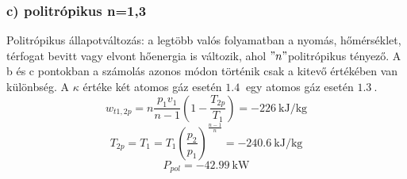 \subsubsection{c) politrópikus n=1,3}
Politrópikus állapotváltozás: a legtöbb valós folyamatban a nyomás, hőmérséklet, térfogat bevitt vagy elvont hőenergia is változik, ahol $"n"$politrópikus tényező. A b és c pontokban a számolás azonos módon történik csak a kitevő értékében van különbség.
A $\kappa$ értéke két atomos gáz esetén $\SI{1,4}{}$ egy atomos gáz esetén $\SI{1,3}{}$.
\begin{equation}
w_{t1,2p}=n\frac{p_1v_1}{n-1}\left(1-\frac{T_{2p}}{T_1}\right)=\SI{-226}{\kilo\joule\per\kilogram}
\end{equation}
\begin{equation}
T_{2p}=T_1=T_1\left(\frac{p_2}{p_1}\right)^\frac{n-1}{n}=\SI{-240,6}{\kilo\joule\per\kilogram}
\end{equation}
\begin{equation}
P_{pol}=\SI{-42,99}{\kilo\watt}
\end{equation}


